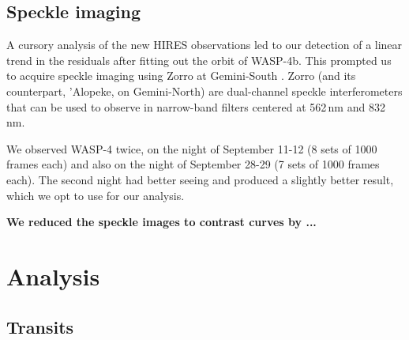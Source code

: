 \documentclass[12pt,twocolumn,tighten]{aastex62}
\begin{document}
\subsection{Speckle imaging}

A cursory analysis of the new HIRES observations led to our detection
of a linear trend in the residuals after fitting out the orbit of
WASP-4b.  This prompted us to acquire speckle imaging using Zorro at
Gemini-South \citep[see][, and the instrument
web-pages\footnote{\url{www.gemini.edu/sciops/instruments/alopeke-zorro/}}]{scott_nessi_2018}.
Zorro (and its counterpart, 'Alopeke, on Gemini-North) are
dual-channel speckle interferometers that can be used to observe in
narrow-band filters centered at 562$\,$nm and 832$\,$nm.  

We observed WASP-4 twice, on the night of September 11-12 (8 sets of
1000 frames each) and also on the night of September 28-29 (7 sets of
1000 frames each). The second night had better seeing and produced a
slightly better result, which we opt to use for our analysis.

{\bf We reduced the speckle images to contrast curves by ...}


\section{Analysis}
\label{sec:analysis}

\subsection{Transits}
\label{sec:transit_analysis}
\end{document}
